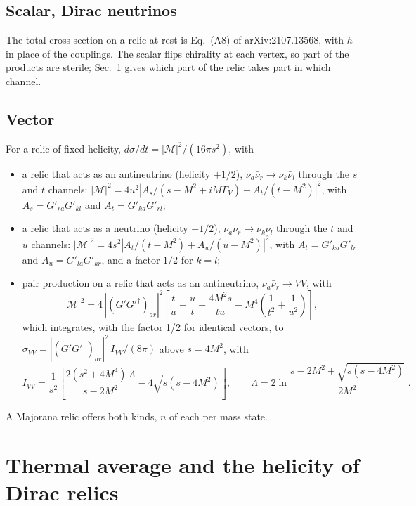 \documentclass[11pt]{article}
\newcommand{\nubar}{\bar\nu}
\begin{document}
\subsection*{Scalar, Dirac neutrinos}

The total cross section on a relic at rest is Eq.~(A8) of arXiv:2107.13568, with $h$ in place of the couplings.
The scalar flips chirality at each vertex, so part of the products are sterile; Sec.~\ref{sec:thermal} gives which part of the relic takes part in which channel.

\subsection*{Vector}

For a relic of fixed helicity, $d\sigma/dt = |\mathcal{M}|^2/(16\pi s^2)$, with
\begin{itemize}
 \item a relic that acts as an antineutrino (helicity $+1/2$), $\nu_a \nubar_r \to \nu_k \nubar_l$ through the $s$ and $t$ channels:
 $|\mathcal{M}|^2 = 4u^2 \left| A_s/(s - M^2 + iM\Gamma_V) + A_t/(t - M^2) \right|^2$, with $A_s = G'_{ra} G'_{kl}$ and $A_t = G'_{ka} G'_{rl}$;
 \item a relic that acts as a neutrino (helicity $-1/2$), $\nu_a \nu_r \to \nu_k \nu_l$ through the $t$ and $u$ channels:
 $|\mathcal{M}|^2 = 4s^2 \left| A_t/(t - M^2) + A_u/(u - M^2) \right|^2$, with $A_t = G'_{ka} G'_{lr}$ and $A_u = G'_{la} G'_{kr}$, and a factor $1/2$ for $k = l$;
 \item pair production on a relic that acts as an antineutrino, $\nu_a \nubar_r \to VV$, with
 \begin{equation*}
 |\mathcal{M}|^2 = 4\, |(G' G'^\dagger)_{ar}|^2 \left[ \frac{t}{u} + \frac{u}{t} + \frac{4M^2 s}{tu} - M^4 \left( \frac{1}{t^2} + \frac{1}{u^2} \right) \right] ,
 \end{equation*}
 which integrates, with the factor 1/2 for identical vectors, to $\sigma_{VV} = |(G' G'^\dagger)_{ar}|^2\, I_{VV}/(8\pi)$ above $s = 4M^2$, with
 \begin{equation*}
 I_{VV} = \frac{1}{s^2} \left[ \frac{2(s^2 + 4M^4)\,\Lambda}{s - 2M^2} - 4\sqrt{s(s - 4M^2)} \right] , \qquad
 \Lambda = 2\ln\frac{s - 2M^2 + \sqrt{s(s - 4M^2)}}{2M^2} \;.
 \end{equation*}
\end{itemize}
A Majorana relic offers both kinds, $n$ of each per mass state.

\section{Thermal average and the helicity of Dirac relics}
\label{sec:thermal}
\end{document}
